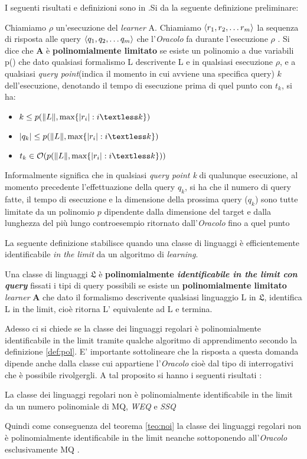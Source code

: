 I seguenti risultati e definizioni sono in \cite{Angluin90}.Si da la seguente definizione preliminare:
\begin{definizione}
Chiamiamo $\rho$ un'esecuzione del \textit{learner} A. Chiamiamo $\Braket{r_1,r_2,\dots r_m}$ la sequenza di risposta alle query $\Braket{q_1,q_2,\dots q_m}$ che l'\textit{Oracolo} fa durante l'esecuzione $\rho$ . Si dice che \textbf{A} è \textbf{polinomialmente  limitato} se esiste un polinomio a due variabili p() che dato qualsiasi formalismo L descrivente  \ac{L} e in qualsiasi esecuzione $\rho$, e a qualsiasi \textit{query point}(indica il momento in cui avviene una specifica query) $k$ dell'esecuzione, denotando il tempo di esecuzione prima di quel punto con $t_k$, si ha:
\begin{itemize}
\item $k \le p(\norma{L} , \text{max}\{\abs{r_i} : i \textless k \})$
\item $\abs{q_k} \le p(\norma{L} , \text{max}\{\abs{r_i} : i \textless k \})$
\item $t_k \in \mathcal{O}(p(\norma{L} , \text{max}\{\abs{r_i} : i \textless k \}))$
\end{itemize}
\end{definizione}
Informalmente significa che in qualsiasi \textit{query point k} di qualunque esecuzione, al momento precedente l'effettuazione della query $q_k$, si ha che il numero di query fatte, il tempo di esecuzione e la dimensione della prossima query ($q_k$) sono tutte limitate da un polinomio $p$ dipendente dalla dimensione del target e dalla lunghezza del più lungo controesempio ritornato dall'\textit{Oracolo} fino a quel punto
   
La seguente definizione stabilisce quando una classe di linguaggi è efficientemente identificabile \textit{in the limit} da un algoritmo di  \textit{learning}. 
\begin{definizione}
\label{def:pol}
Una classe di linguaggi $\mathfrak{L}$ è \textbf{polinomialmente \textit{identificabile in the limit con query}} fissati i tipi di query possibili se esiste un \textbf{polinomialmente limitato} \textit{learner} \textbf{A} che dato il formalismo descrivente qualsiasi linguaggio L in  $\mathfrak{L}$, identifica L in the limit, cioè ritorna  L' equivalente ad L e termina.
\end{definizione}

Adesso ci si chiede se la classe dei linguaggi regolari è polinomialmente identificabile in the limit tramite qualche algoritmo di apprendimento secondo la definizione \ref{def:pol}. E' importante sottolineare che la risposta a questa domanda dipende anche dalla classe cui appartiene l'\textit{Oracolo} cioè dal tipo di interrogativi che è possibile rivolgergli.  A tal proposito si hanno i seguenti risultati :
\begin{teorema}
\label{teo:noi}
La classe dei linguaggi regolari  non è polinomialmente identificabile in the limit da un numero polinomiale di \ac{MQ}, \textit{WEQ} e \textit{SSQ}
\end{teorema}
Quindi come conseguenza del teorema \ref{teo:noi}   la classe dei linguaggi regolari non è polinomialmente identificabile in the limit  neanche sottoponendo all'\textit{Oracolo} esclusivamente \ac{MQ} .

